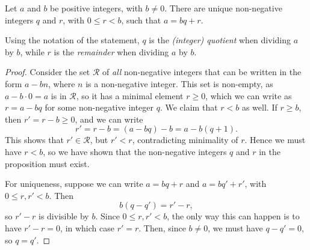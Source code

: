 \begin{proposition}
Let $a$ and $b$ be positive integers, with $b\neq 0$. There are unique non-negative integers $q$ and $r$, with $0\leq r < b$, such that $a = bq + r$.
\end{proposition}
Using the notation of the statement, $q$ is the \emph{(integer) quotient} when dividing $a$ by $b$, while $r$ is the \emph{remainder} when dividing $a$ by $b$.
\begin{proof}
Consider the set $\mathcal{R}$ of \textit{all} non-negative integers that can be written in the form $a - bn$, where $n$ is a non-negative integer. This set is non-empty, as $a - b\cdot 0 = a$ is in $\mathcal{R}$, so it has a minimal element $r\geq 0$, which we can write as $r = a - bq$ for some non-negative integer $q$. We claim that $r < b$ as well. If $r\geq b$, then $r' = r - b\geq 0$, and we can write
\begin{equation}
r' = r - b = (a - bq) - b = a - b(q + 1).
\end{equation}
This shows that $r'\in\mathcal{R}$, but $r' < r$, contradicting minimality of $r$. Hence we must have $r < b$, so we have shown that the non-negative integers $q$ and $r$ in the proposition must exist.\par
For uniqueness, suppose we can write $a = bq + r$ and $a = bq' + r'$, with $0\leq r,r' < b$. Then
\begin{equation}
b(q - q') = r' - r,
\end{equation}
so $r' - r$ is divisible by $b$. Since $0\leq r,r' < b$, the only way this can happen is to have $r' - r = 0$, in which case $r' = r$. Then, since $b\neq 0$, we must have $q - q' = 0$, so $q = q'$.
\end{proof}